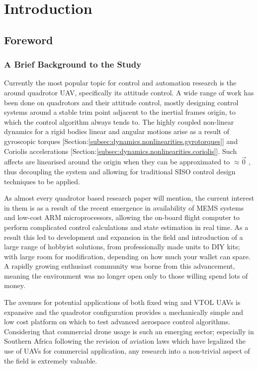 \chapter{Introduction}
\label{ch:intro}
\section{Foreword}
\label{sec:intro.foreword}
\subsection{A Brief Background to the Study}
\label{subsec:intro.foreword.background}
Currently the most popular topic for control and automation research is the around quadrotor UAV, specifically its attitude control. A wide range of work has been done on quadrotors and their attitude control, mostly designing control systems around a stable trim point adjacent to the inertial frames origin, to which the control algorithm always tends to. The highly coupled non-linear dynamics for a rigid bodies linear and angular motions arise as a result of gyroscopic torques [Section:\ref{subsec:dynamics.nonlinearities.gyrotorques}] and Coriolis accelerations [Section:\ref{subsec:dynamics.nonlinearities.coriolis}]. Such affects are linearised around the origin when they can be approximated to $\approx \vec{0}$ , thus decoupling the system and allowing for traditional SISO control design techniques to be applied.
\par
As almost every quadrotor based research paper will mention, the current interest in them is as a result of the recent emergence in availability of MEMS systems and low-cost ARM microprocessors, allowing the on-board flight computer to perform complicated control calculations and state estimation in real time. As a result this led to development and expansion in the field and introduction of a large range of hobbyist solutions, from professionally made units to DIY kits; with large room for modification, depending on how much your wallet can spare. A rapidly growing enthusiast community was borne from this advancement, meaning the environment was no longer open only to those willing spend lots of money.
\par
The avenues for potential applications of both fixed wing and VTOL UAVs is expansive and the quadrotor configuration provides a mechanically simple and low cost platform on which to test advanced aerospace control algorithms. Considering that commercial drone usage is such an emerging sector; especially in Southern Africa following the revision of aviation laws \cite{safedrone} which have legalized the use of UAVs for commercial application, any research into a non-trivial aspect of the field is extremely valuable. 

